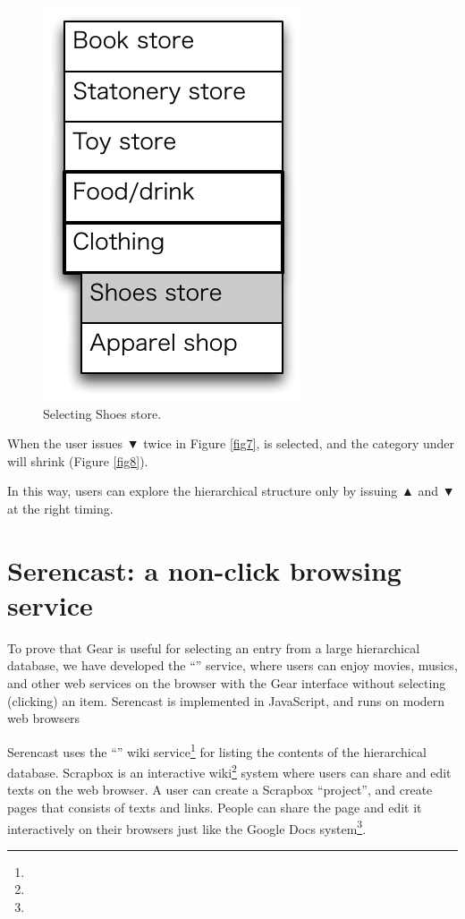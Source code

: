\documentclass[conference]{IEEEtran}
\def\up{▲}
\def\down{▼}
\def\SC{Serencast}
\def\SB{Scrapbox}
\begin{document}
\begin{figure}[H]
\centerline{\includegraphics[width=\menuwidth,bb=0 0 139 211]{figures/fig9.pdf}}
\caption{Selecting Shoes store.}
\label{fig9}
\end{figure}

When the user issues {\down} twice in Figure \ref{fig7},
 is selected, and the category under  will shrink (Figure \ref{fig8}).

In this way, users can explore the hierarchical structure
only by issuing {\up} and {\down} at the right timing.

\section{Serencast: a non-click browsing service}


To prove that Gear is useful for selecting an entry from a
large hierarchical database,
we have developed the ``\tsf{\SC}'' service, where
users can enjoy movies, musics, and other web services
on the browser with the Gear interface without selecting (clicking) an item.
{\SC} is implemented in JavaScript, and runs on modern web browsers

{\SC} uses the ``\tsf{\SB}'' wiki service\footnote{
} for listing the contents of the hierarchical database.
{\SB} is an interactive wiki\footnote{
} system where users can share and edit texts on the web browser.
A user can create a {\SB} ``project'', and create pages
that consists of texts and links.
People can share the page and edit it interactively on their browsers
just like the Google Docs system\footnote{
}.
\end{document}
